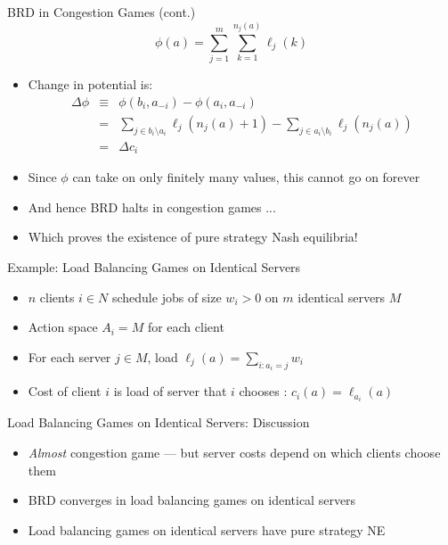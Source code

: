 \documentclass[11pt,aspectratio=169,handout]{beamer}
\begin{document}
  
  \begin{frame}{BRD in Congestion Games (cont.)}
   $$\phi(a) = \sum_{j=1}^m \sum_{k=1}^{n_j(a)} \ell_j(k)$$
   \begin{itemize}[<+->]
    \item Change in potential is:
    \begin{eqnarray*}
     \Delta\phi & \equiv & \phi(b_i, a_{-i}) - \phi(a_i, a_{-i}) \\
     & = & \sum_{j \in b_i\setminus a_i}\ell_j(n_j(a)+1) - \sum_{j \in a_i \setminus b_i}\ell_j(n_j(a)) \\
     & = & \Delta c_i
    \end{eqnarray*}
    \item Since $\phi$ can take on only finitely many values, this cannot go on forever
    \item And hence BRD halts in congestion games ...
    \item Which proves the \alert{existence} of pure strategy Nash equilibria!
   \end{itemize}
  \end{frame}
  
  
  \begin{frame}{Example: Load Balancing Games on Identical Servers}
   \begin{itemize}[<+->]
   \setlength{\itemsep}{1.5em}
    \item $n$ clients $i \in N$ schedule jobs of size $w_i > 0$ on $m$ identical servers $M$
    \item Action space $A_i = M$ for each client
    \item For each server $j \in M$, load $\ell_j(a) = \sum_{i : a_i = j}w_i$
    \item Cost of client $i$ is load of server that $i$ chooses : $c_i(a) = \ell_{a_i}(a)$
   \end{itemize}
  \end{frame}
  
  
  \begin{frame}{Load Balancing Games on Identical Servers: Discussion}
   \begin{itemize}[<+->]
   \setlength{\itemsep}{1.5em}
    \item \textit{Almost} congestion game --- but server costs depend on \alert{which} clients choose them
    \item BRD converges in load balancing games on identical servers
    \item Load balancing games on identical servers have pure strategy NE
   \end{itemize}
  \end{frame}
  
\end{document}
